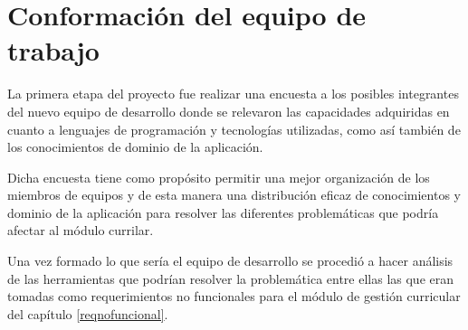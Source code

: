 \section{Conformación del equipo de trabajo} \label{analisis_herramientas}
La primera etapa del proyecto fue realizar una encuesta a los posibles integrantes del nuevo equipo de desarrollo donde se relevaron las capacidades adquiridas en cuanto a lenguajes de programación y tecnologías utilizadas, como así también de los conocimientos de dominio de la aplicación.

Dicha encuesta tiene como propósito permitir una mejor organización de los miembros de equipos y de esta manera una distribución eficaz de conocimientos y dominio de la aplicación para resolver las diferentes problemáticas que podría afectar al módulo currilar.

Una vez formado lo que sería el equipo de desarrollo se procedió a hacer análisis de las herramientas que podrían resolver la problemática entre ellas las que eran tomadas como requerimientos no funcionales para el módulo de gestión curricular del capítulo \ref{reqnofuncional}.
